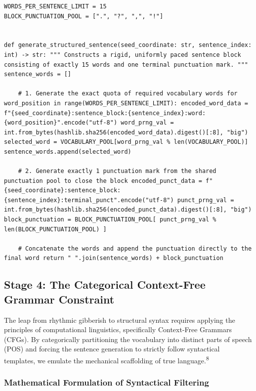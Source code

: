\documentclass[
  11pt,
  a4paper,
]{article}
\begin{document}
\begin{lstlisting}[style=babelpython]
WORDS_PER_SENTENCE_LIMIT = 15
BLOCK_PUNCTUATION_POOL = [".", "?", ",", "!"]


def generate_structured_sentence(seed_coordinate: str, sentence_index: int) -> str: """ Constructs a rigid, uniformly paced sentence block consisting of exactly 15 words and one terminal punctuation mark. """ sentence_words = []

    # 1. Generate the exact quota of required vocabulary words for word_position in range(WORDS_PER_SENTENCE_LIMIT): encoded_word_data = f"{seed_coordinate}:sentence_block:{sentence_index}:word:{word_position}".encode("utf-8") word_prng_val = int.from_bytes(hashlib.sha256(encoded_word_data).digest()[:8], "big") selected_word = VOCABULARY_POOL[word_prng_val % len(VOCABULARY_POOL)] sentence_words.append(selected_word)

    # 2. Generate exactly 1 punctuation mark from the shared punctuation pool to close the block encoded_punct_data = f"{seed_coordinate}:sentence_block:{sentence_index}:terminal_punct".encode("utf-8") punct_prng_val = int.from_bytes(hashlib.sha256(encoded_punct_data).digest()[:8], "big") block_punctuation = BLOCK_PUNCTUATION_POOL[ punct_prng_val % len(BLOCK_PUNCTUATION_POOL) ]

    # Concatenate the words and append the punctuation directly to the final word return " ".join(sentence_words) + block_punctuation \end{lstlisting}


\subsection{Stage 4: The Categorical Context-Free Grammar Constraint}\label{stage-4-the-categorical-context-free-grammar-constraint}

The leap from rhythmic gibberish to structural syntax requires applying the principles of computational linguistics, specifically Context-Free Grammars (CFGs). By categorically partitioning the vocabulary into distinct parts of speech (POS) and forcing the sentence generation to strictly follow syntactical templates, we emulate the mechanical scaffolding of true language.\textsuperscript{8}

\subsubsection{Mathematical Formulation of Syntactical Filtering}\label{mathematical-formulation-of-syntactical-filtering}
\end{document}
